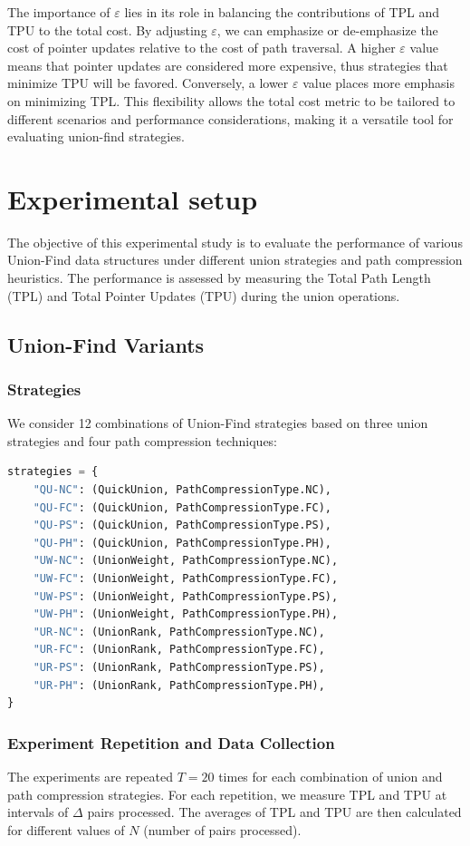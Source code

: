\documentclass[10pt,a4paper,hidelinks]{article}
\begin{document}
The importance of $\varepsilon$ lies in its role in balancing the contributions of TPL and TPU to the total cost. By adjusting $\varepsilon$, we can emphasize or de-emphasize the cost of pointer updates relative to the cost of path traversal. A higher $\varepsilon$ value means that pointer updates are considered more expensive, thus strategies that minimize TPU will be favored. Conversely, a lower $\varepsilon$ value places more emphasis on minimizing TPL. This flexibility allows the total cost metric to be tailored to different scenarios and performance considerations, making it a versatile tool for evaluating union-find strategies.


\section{Experimental setup}
The objective of this experimental study is to evaluate the performance of various Union-Find data structures under different union strategies and path compression heuristics. The performance is assessed by measuring the Total Path Length (TPL) and Total Pointer Updates (TPU) during the union operations.
\subsection{Union-Find Variants}
\subsubsection{Strategies}
We consider 12 combinations of Union-Find strategies based on three union strategies and four path compression techniques:
\begin{lstlisting}[language=Python]
strategies = {
    "QU-NC": (QuickUnion, PathCompressionType.NC),
    "QU-FC": (QuickUnion, PathCompressionType.FC),
    "QU-PS": (QuickUnion, PathCompressionType.PS),
    "QU-PH": (QuickUnion, PathCompressionType.PH),
    "UW-NC": (UnionWeight, PathCompressionType.NC),
    "UW-FC": (UnionWeight, PathCompressionType.FC),
    "UW-PS": (UnionWeight, PathCompressionType.PS),
    "UW-PH": (UnionWeight, PathCompressionType.PH),
    "UR-NC": (UnionRank, PathCompressionType.NC),
    "UR-FC": (UnionRank, PathCompressionType.FC),
    "UR-PS": (UnionRank, PathCompressionType.PS),
    "UR-PH": (UnionRank, PathCompressionType.PH),
}
\end{lstlisting}

\subsubsection{Experiment Repetition and Data Collection}
The experiments are repeated $T = 20$ times for each combination of union and path compression strategies. For each repetition, we measure TPL and TPU at intervals of $\Delta$ pairs processed. The averages of TPL and TPU are then calculated for different values of $N$ (number of pairs processed).\\
\end{document}
